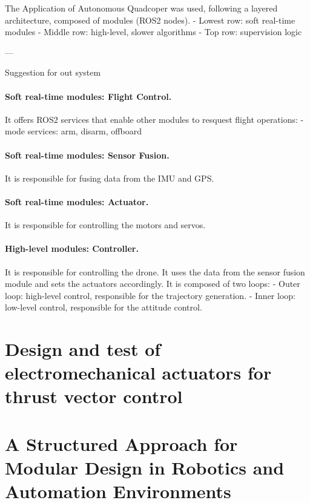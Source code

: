 \documentclass[a4paper]{article}
\begin{document}
The Application of Autonomous Quadcoper was used, following a layered architecture, composed of modules (ROS2 nodes). 
- Lowest row: soft real-time modules 
- Middle row: high-level, slower algorithms 
- Top row: supervision logic 

---

Suggestion for out system

\paragraph{Soft real-time modules: Flight Control. }
It offers ROS2 services that enable other modules to resquest flight operations: 
- mode services: arm, disarm, offboard

\paragraph{Soft real-time modules: Sensor Fusion. }
It is responsible for fusing data from the IMU and GPS. 

\paragraph{Soft real-time modules: Actuator. }
It is responsible for controlling the motors and servos. 

\paragraph{High-level modules: Controller. }
It is responsible for controlling the drone.
It uses the data from the sensor fusion module and sets the actuators accordingly.
It is composed of two loops:
- Outer loop: high-level control, responsible for the trajectory generation.
- Inner loop: low-level control, responsible for the attitude control.


\section{Design and test of electromechanical actuators for thrust vector control}

\cite{cowan1993design}


\section{A Structured Approach for Modular Design in Robotics and Automation Environments}

\cite{elkady2013structured}


\clearpage
\normalem

\ULforem


\end{document}
